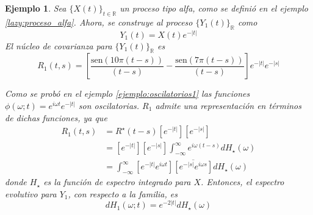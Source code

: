 \documentclass[12pt,letterpaper]{book}
\newtheorem{ejemplo}{Ejemplo}[chapter]
\newcommand{\R}{\mathbb{R}}
\newcommand{\intR}{\int_{-\infty}^{\infty}}
\newcommand{\SEN}[1]{\mathrm{sen}\left( #1 \right)}
\newcommand{\abso}[1]{\left| #1 \right|}
\newcommand{\xtin}[1]{$\{X(t)\}_{t\in \mathcal{ #1 }}$ }
\begin{document}
\begin{ejemplo}
Sea \xtin{\R} un proceso tipo alfa, como se definió en el ejemplo \ref{lazy:proceso_alfa}. 
%
Ahora, se construye al proceso $\{Y_1(t)\}_{\R}$ como
\begin{equation}
Y_1(t) = X(t) e^{-\abso{t}}
\end{equation}
%
El núcleo de covarianza para $\{Y_1(t)\}_{\R}$ es
\begin{equation}
R_1(t,s) = \left[ \frac{\SEN{10 \pi (t-s)}}{(t-s)} - \frac{\SEN{7 \pi (t-s)}}{(t-s)} \right] e^{-\abso{t} } e^{-\abso{s}}
\end{equation}

Como se probó en el ejemplo \ref{ejemplo:oscilatorios1} las funciones $\phi(\omega; t) = e^{i \omega t} e^{-\abso{t}}$ son oscilatorias. $R_1$ admite una representación en términos de dichas funciones, ya que
\begin{align*}
R_1(t,s) &= R^\star(t-s) \left[e^{-\abso{t}}\right] \left[ e^{-\abso{s}} \right] \\
&= \left[e^{-\abso{t}}\right] \left[ e^{-\abso{s}} \right] \intR e^{i \omega (t-s)} dH_\star(\omega) \\
&= \intR \left[e^{-\abso{t}} e^{i \omega t} \right] \overline{\left[ e^{-\abso{s}} e^{i \omega s} \right]}  dH_\star(\omega)
\end{align*}
donde $H_\star$ es la función de espectro integrado para $X$. Entonces, el espectro evolutivo para $Y_1$, con respecto a la familia, es
\begin{equation}
dH_1(\omega;t) = e^{- 2 \abso{t}} dH_\star(\omega)
\end{equation}
\label{ejemplo:lazy1}
\end{ejemplo}
\end{document}
